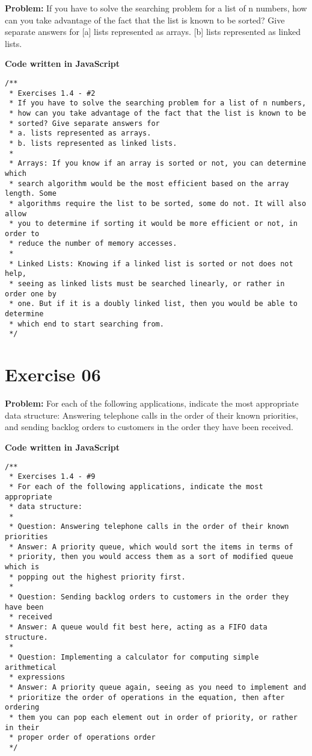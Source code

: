 \documentclass[paper=a4, fontsize=11pt]{scrartcl} %
\numberwithin{equation}{section} %
\numberwithin{figure}{section} %
\numberwithin{table}{section} %
\begin{document}
\textbf{Problem:} If you have to solve the searching problem for a list of n numbers, how can you take advantage of the fact that the list is known to be sorted? Give separate answers for
  [a] lists represented as arrays.
  [b] lists represented as linked lists.

\bigskip
\textbf{Code written in JavaScript}
\begin{lstlisting}
/**
 * Exercises 1.4 - #2
 * If you have to solve the searching problem for a list of n numbers,
 * how can you take advantage of the fact that the list is known to be
 * sorted? Give separate answers for
 * a. lists represented as arrays.
 * b. lists represented as linked lists.
 * 
 * Arrays: If you know if an array is sorted or not, you can determine which
 * search algorithm would be the most efficient based on the array length. Some
 * algorithms require the list to be sorted, some do not. It will also allow
 * you to determine if sorting it would be more efficient or not, in order to
 * reduce the number of memory accesses.
 * 
 * Linked Lists: Knowing if a linked list is sorted or not does not help, 
 * seeing as linked lists must be searched linearly, or rather in order one by 
 * one. But if it is a doubly linked list, then you would be able to determine 
 * which end to start searching from.
 */
\end{lstlisting}


\section{Exercise 06}

\textbf{Problem:} For each of the following applications, indicate the most appropriate data structure: Answering telephone calls in the order of their known priorities, and sending backlog orders to customers in the order they have been received.

\bigskip
\textbf{Code written in JavaScript}
\begin{lstlisting}
/**
 * Exercises 1.4 - #9
 * For each of the following applications, indicate the most appropriate 
 * data structure:
 * 
 * Question: Answering telephone calls in the order of their known priorities
 * Answer: A priority queue, which would sort the items in terms of
 * priority, then you would access them as a sort of modified queue which is 
 * popping out the highest priority first.
 * 
 * Question: Sending backlog orders to customers in the order they have been
 * received
 * Answer: A queue would fit best here, acting as a FIFO data structure.
 * 
 * Question: Implementing a calculator for computing simple arithmetical
 * expressions
 * Answer: A priority queue again, seeing as you need to implement and
 * prioritize the order of operations in the equation, then after ordering
 * them you can pop each element out in order of priority, or rather in their
 * proper order of operations order
 */
\end{lstlisting}
\end{document}
